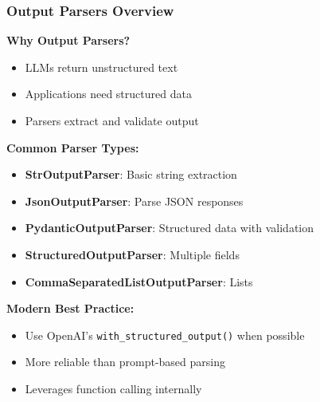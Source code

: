 \begin{frame}[fragile]\frametitle{Output Parsers Overview}

\textbf{Why Output Parsers?}
\begin{itemize}
\item LLMs return unstructured text
\item Applications need structured data
\item Parsers extract and validate output
\end{itemize}

\textbf{Common Parser Types:}
\begin{itemize}
\item \textbf{StrOutputParser}: Basic string extraction
\item \textbf{JsonOutputParser}: Parse JSON responses
\item \textbf{PydanticOutputParser}: Structured data with validation
\item \textbf{StructuredOutputParser}: Multiple fields
\item \textbf{CommaSeparatedListOutputParser}: Lists
\end{itemize}

\textbf{Modern Best Practice:}
\begin{itemize}
\item Use OpenAI's \texttt{with\_structured\_output()} when possible
\item More reliable than prompt-based parsing
\item Leverages function calling internally
\end{itemize}

\end{frame}

